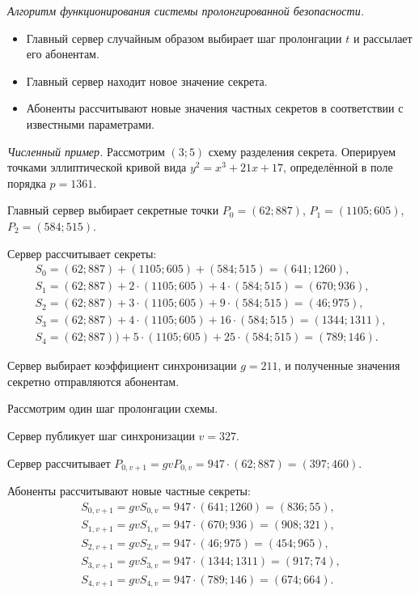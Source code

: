 \textit{Алгоритм функционирования системы пролонгированной безопасности.}
\begin{itemize}
 \item[1.] Главный сервер случайным образом выбирает шаг пролонгации $t$ и рассылает
его абонентам.

 \item[2.] Главный сервер находит новое значение секрета.

 \item[3.] Абоненты рассчитывают новые значения частных секретов в соответствии с
известными параметрами.

\end{itemize}


\textit{Численный пример.}
Рассмотрим $(3; 5)$ схему разделения секрета. Оперируем точками эллиптической
кривой вида $y^2=x^3+21x+17$, определённой в поле порядка $p=\mbox{1361}$.

Главный сервер выбирает секретные точки $P_0 =(62; 887)$, $P_1 =(1105; 605)$,
$P_2 =(584; 515)$.

Сервер рассчитывает секреты:
\[
\begin{array}{l}
S_0 =(62; 887)+(1105; 605)+(584; 515)=(641; 1260),\\
S_1 =(62; 887)+2\cdot (1105; 605)+4\cdot (584; 515)=(670; 936),\\
S_2 =(62; 887)+3\cdot (1105; 605)+9\cdot (584; 515)=(46; 975),\\
S_3 =(62; 887)+4\cdot (1105; 605)+16\cdot (584; 515)=(1344; 1311),\\
S_4 =(62; 887))+5\cdot (1105; 605)+25\cdot (584; 515)=(789; 146).
\end{array}
\]

Сервер выбирает коэффициент синхронизации $g=211$, и полученные значения
секретно отправляются абонентам.

Рассмотрим один шаг пролонгации схемы.

Сервер публикует шаг синхронизации $v=327$.

Сервер рассчитывает $P_{0, v+1} =gvP_{0,v} =947\cdot (62; 887)=(397; 460)$.

Абоненты рассчитывают новые частные секреты:
\[
\begin{array}{l}
S_{0, v+1} =gvS_{0, v} =947\cdot (641; 1260)=(836; 55),
\\
S_{1, v+1} =gvS_{1, v} =947\cdot (670; 936)=(908; 321),
\\
S_{2, v+1} =gvS_{2, v} =947\cdot (46; 975)=(454; 965),
\\
S_{3, v+1} =gvS_{3, v} =947\cdot (1344; 1311)=(917; 74),
\\
S_{4, v+1} =gvS_{4, v} =947\cdot (789; 146)=(674; 664).
\end{array}
\]
\smallskip


